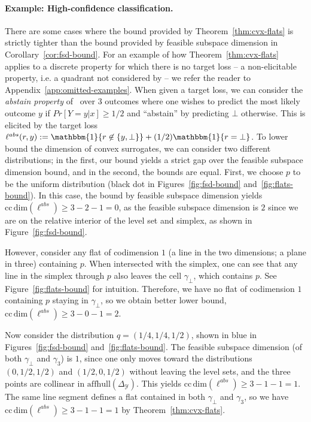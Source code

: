 \documentclass{article}
\newcommand{\Comments}{1}
\newcommand{\mytodo}[2]{\ifnum\Comments=1%
	\todo[linecolor=#1!80!black,backgroundcolor=#1,bordercolor=#1!80!black]{#2}\fi}
\newcommand{\raft}[1]{\mytodo{green!20!white}{RF: #1}}
\newcommand{\jessiet}[1]{\mytodo{purple!20!white}{JF: #1}}
\newcommand{\simplex}{\Delta_\Y}
\newcommand{\ccdim}{\mathrm{cc\,dim}}
\newcommand{\affhull}{\mathrm{affhull}}
\newcommand{\Y}{\mathcal{Y}}
\begin{document}
\paragraph{Example: High-confidence classification.}\label{subsec:examples-finite}
There are some cases where the bound provided by Theorem~\ref{thm:cvx-flats} is strictly tighter than the bound provided by feasible subspace dimension in Corollary~\ref{cor:fsd-bound}.
For an example of how Theorem~\ref{thm:cvx-flats} applies to a discrete property for which there is no target loss -- a non-elicitable property, i.e. a quadrant not considered by \citet{ramaswamy2018consistent} -- we refer the reader to Appendix~\ref{app:omitted-examples}. 
When given a target loss, we can consider the \emph{abstain property} of~\citet{ramaswamy2018consistent} over 3 outcomes where one wishes to predict the most likely outcome $y$ if $Pr[Y=y|x] \geq 1/2$ and ``abstain'' by predicting $\bot$ otherwise.
This is elicited by the target loss $\ell^{abs}(r,y) := \mathbbm{1}\{r \not \in \{y, \bot\}\} + (1/2)\mathbbm{1}\{r = \bot\}$. 
To lower bound the dimension of convex surrogates, we can consider two different distributions; in the first, our bound yields a strict gap over the feasible subspace dimension bound, and in the second, the bounds are equal.
First, we choose $p$ to be the uniform distribution (black dot in Figures~\ref{fig:fsd-bound} and~\ref{fig:flats-bound}).
In this case, the bound by feasible subspace dimension yields $\ccdim(\ell^{abs}) \geq 3 - 2 - 1 = 0$, as the feasible subspace dimension is $2$ since we are on the relative interior of the level set and simplex, as shown in Figure~\ref{fig:fsd-bound}.

However, consider any flat of codimension $1$ (a line in the two dimensions; a plane in three) containing $p$.
When intersected with the simplex, one can see that any line in the simplex through $p$ also leaves the cell $\gamma_\bot$, which contains $p$.
See Figure~\ref{fig:flats-bound} for intuition.
Therefore, we have no flat of codimension $1$ containing $p$ staying in $\gamma_\bot$, so we obtain better lower bound, $\ccdim(\ell^{abs}) \geq 3 - 0 - 1 = 2$.

Now consider the distribution $q = (1/4, 1/4, 1/2)$, shown in blue in Figures~\ref{fig:fsd-bound} and~\ref{fig:flats-bound}.
The feasible subspace dimension (of both $\gamma_\bot$ and $\gamma_3$) is $1$, since one only moves toward the distributions $(0,1/2, 1/2)$ and $(1/2, 0, 1/2)$ without leaving the level sets, and the three points are collinear in $\affhull(\simplex)$.  
This yields $\ccdim(\ell^{abs}) \geq 3 - 1- 1 = 1$.
The same line segment defines a flat contained in both $\gamma_\bot$ and $\gamma_3$, so we have $\ccdim(\ell^{abs}) \geq 3 - 1 - 1 = 1$ by Theorem~\ref{thm:cvx-flats}.
\end{document}
